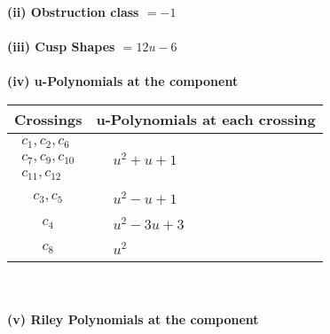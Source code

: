 \documentclass[1p]{elsarticle_modified}
\theoremstyle{definition}
\begin{document}
\flushleft \textbf{(ii) Obstruction class $= -1$}\\~\\
\flushleft \textbf{(iii) Cusp Shapes $= 12 u-6$}\\~\\
\newpage\renewcommand{\arraystretch}{1}
\flushleft \textbf{(iv) u-Polynomials at the component}\newline \\
\begin{tabular}{m{50pt}|m{274pt}}
Crossings & \hspace{64pt}u-Polynomials at each crossing \\
\hline $$\begin{aligned}c_{1},c_{2},c_{6}\\c_{7},c_{9},c_{10}\\c_{11},c_{12}\end{aligned}$$&$\begin{aligned}
&u^2+u+1
\end{aligned}$\\
\hline $$\begin{aligned}c_{3},c_{5}\end{aligned}$$&$\begin{aligned}
&u^2- u+1
\end{aligned}$\\
\hline $$\begin{aligned}c_{4}\end{aligned}$$&$\begin{aligned}
&u^2-3 u+3
\end{aligned}$\\
\hline $$\begin{aligned}c_{8}\end{aligned}$$&$\begin{aligned}
&u^2
\end{aligned}$\\
\hline
\end{tabular}\\~\\
\newpage\renewcommand{\arraystretch}{1}
\flushleft \textbf{(v) Riley Polynomials at the component}\newline \\
\end{document}
